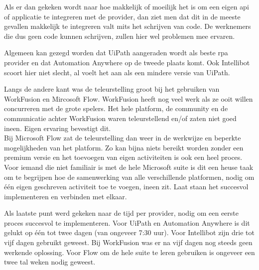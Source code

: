 Als er dan gekeken wordt naar hoe makkelijk of moeilijk het is om een eigen \acrshort{api} of applicatie te integreren met de provider, dan ziet men dat dit in de meeste gevallen makkelijk te integreren valt mits het schrijven van code. De werknemers die dus geen code kunnen schrijven, zullen hier wel problemen mee ervaren.

Algemeen kan gezegd worden dat UiPath aangeraden wordt als beste \acrshort{rpa} provider en dat Automation Anywhere op de tweede plaats komt. Ook Intellibot scoort hier niet slecht, al voelt het aan als een mindere versie van UiPath.

Langs de andere kant was de teleurstelling groot bij het gebruiken van WorkFusion en Mircosoft Flow. WorkFusion heeft nog veel werk als ze ooit willen concurreren met de grote spelers. Het hele platform, de community en de communicatie achter WorkFusion waren teleurstellend en/of zaten niet goed ineen. Eigen ervaring bevestigt dit.\\
Bij Microsoft Flow zat de teleurstelling dan weer in de werkwijze en beperkte mogelijkheden van het platform. Zo kan bijna niets bereikt worden zonder een premium versie en het toevoegen van eigen activiteiten is ook een heel proces. Voor iemand die niet familiair is met de hele Microsoft suite is dit een heuse taak om te begrijpen hoe de samenwerking van alle verschillende platformen, nodig om één eigen geschreven \gls{activiteit} toe te voegen, ineen zit. Laat staan het succesvol implementeren en verbinden met elkaar.

Als laatste punt werd gekeken naar de tijd per provider, nodig om een eerste proces succesvol te implementeren. Voor UiPath en Automation Anywhere is dit gelukt op één tot twee dagen (van ongeveer 7:30 uur). Voor Intellibot zijn drie tot vijf dagen gebruikt geweest. Bij WorkFusion was er na vijf dagen nog steeds geen werkende oplossing. Voor Flow om de hele suite te leren gebruiken is ongeveer een twee tal weken nodig geweest.